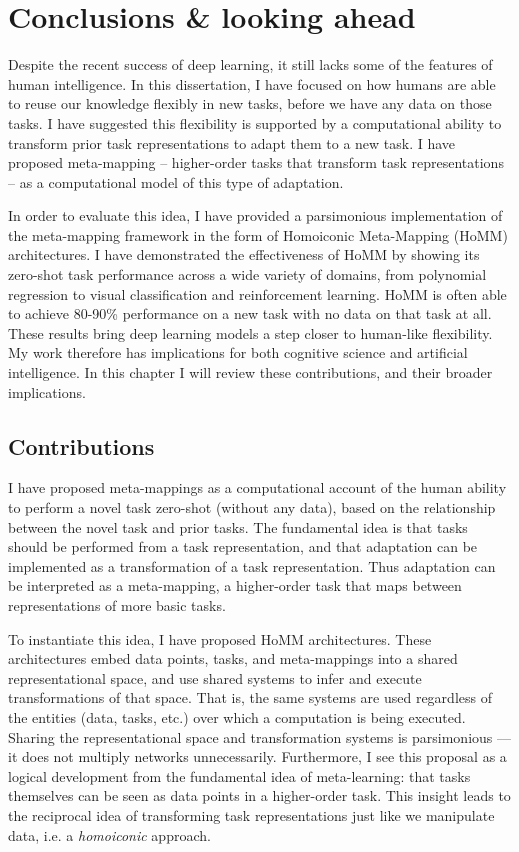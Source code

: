 \chapter{Conclusions \& looking ahead} \label{chapter:conclusions}

Despite the recent success of deep learning, it still lacks some of the features of human intelligence. In this dissertation, I have focused on how humans are able to reuse our knowledge flexibly in new tasks, before we have any data on those tasks. I have suggested this flexibility is supported by a computational ability to transform prior task representations to adapt them to a new task. I have proposed meta-mapping -- higher-order tasks that transform task representations -- as a computational model of this type of adaptation. \par
In order to evaluate this idea, I have provided a parsimonious implementation of the meta-mapping framework in the form of Homoiconic Meta-Mapping (HoMM) architectures. I have demonstrated the effectiveness of HoMM by showing its zero-shot task performance across a wide variety of domains, from polynomial regression to visual classification and reinforcement learning. HoMM is often able to achieve 80-90\% performance on a new task with no data on that task at all. These results bring deep learning models a step closer to human-like flexibility. My work therefore has implications for both cognitive science and artificial intelligence. In this chapter I will review these contributions, and their broader implications. \par  

\section{Contributions}

I have proposed meta-mappings as a computational account of the human ability to perform a novel task zero-shot (without any data), based on the relationship between the novel task and prior tasks. The fundamental idea is that tasks should be performed from a task representation, and that adaptation can be implemented as a transformation of a task representation. Thus adaptation can be interpreted as a meta-mapping, a higher-order task that maps between representations of more basic tasks. \par  

To instantiate this idea, I have proposed HoMM architectures. These architectures embed data points, tasks, and meta-mappings into a shared representational space, and use shared systems to infer and execute transformations of that space. That is, the same systems are used regardless of the entities (data, tasks, etc.) over which a computation is being executed. Sharing the representational space and transformation systems is parsimonious --- it does not multiply networks unnecessarily. Furthermore, I see this proposal as a logical development from the fundamental idea of meta-learning: that tasks themselves can be seen as data points in a higher-order task. This insight leads to the reciprocal idea of transforming task representations just like we manipulate data, i.e. a \emph{homoiconic} approach. \par  

